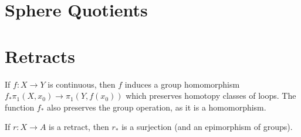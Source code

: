 
\section*{Sphere Quotients}
\section*{Retracts}



If $f:X\rightarrow Y$ is continuous, then $f$ induces a group homomorphism $f_*\pi_1(X,x_0)\rightarrow \pi_1(Y,f(x_0))$ which preserves homotopy classes of loops.  The function $f_*$ also preserves the group operation, as it is a homomorphism.

If $r:X\rightarrow A$ is a retract, then $r_*$ is a surjection (and an epimorphism of groups).